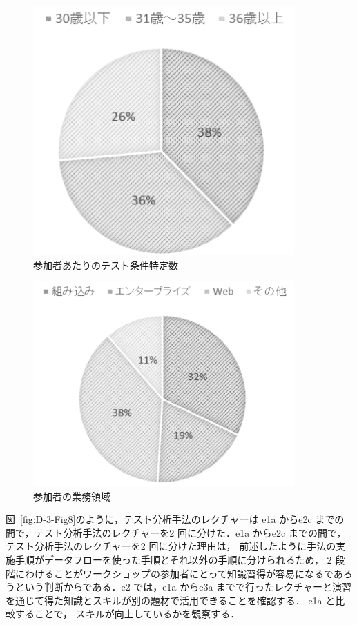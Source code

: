 \documentclass[a4paper,11pt]{jreport}
\begin{document}
\begin{figure}[h]
  \begin{center}
  \includegraphics[width=10cm]{./image/D-3-Fig6.png}
  \caption{参加者あたりのテスト条件特定数}
  \label{fig:D-3-Fig6}
  \end{center}
   \end{figure}

   \begin{figure}[h]
  \begin{center}
  \includegraphics[width=10cm]{./image/D-3-Fig7.png}
  \caption{参加者の業務領域}
  \label{fig:D-3-Fig7}
  \end{center}
   \end{figure}

図~\ref{fig:D-3-Fig8}のように，テスト分析手法のレクチャーは e1a からe2c までの間で，テスト分析手法のレクチャーを2 回に分けた．e1a からe2c までの間で，テスト分析手法のレクチャーを2 回に分けた理由は， 前述したように手法の実施手順がデータフローを使った手順とそれ以外の手順に分けられるため， 2 段階にわけることがワークショップの参加者にとって知識習得が容易になるであろうという判断からである．e2 では，e1a からe3a までで行ったレクチャーと演習を通じて得た知識とスキルが別の題材で活用できることを確認する． e1a と比較することで， スキルが向上しているかを観察する．
\end{document}
